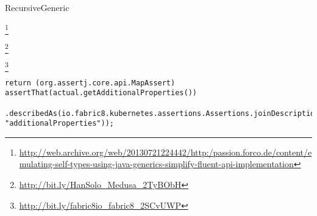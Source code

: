 \begin{pattern}{RecursiveGeneric}


\footnote{\url{http://web.archive.org/web/20130721224442/http:/passion.forco.de/content/emulating-self-types-using-java-generics-simplify-fluent-api-implementation}}

\instances{}

\footnote{\url{http://bit.ly/HanSolo_Medusa_2TyBObH}}




\footnote{\url{http://bit.ly/fabric8io_fabric8_2SCvUWP}}

\begin{verbatim}
return (org.assertj.core.api.MapAssert) assertThat(actual.getAdditionalProperties())
    .describedAs(io.fabric8.kubernetes.assertions.Assertions.joinDescription(this, "additionalProperties"));
\end{verbatim}

\detection{}

\discussion{}

\related{}

\end{pattern}